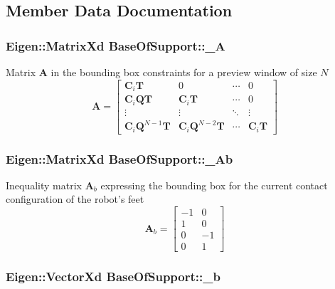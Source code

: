 \subsection{\-Member \-Data \-Documentation}
\hypertarget{classBaseOfSupport_a54a35d087a8dfaee9a27d025d46f706d}{
\subsubsection[{\-\_\-\-A}]{\setlength{\rightskip}{0pt plus 5cm}\-Eigen\-::\-Matrix\-Xd {\bf \-Base\-Of\-Support\-::\-\_\-\-A}}}\label{classBaseOfSupport_a54a35d087a8dfaee9a27d025d46f706d}
\-Matrix $\mathbf{A}$ in the bounding box constraints for a preview window of size $N$ \[ \mathbf{A} = \left[\begin{array}{cccc} \mathbf{C}_i\mathbf{T} & 0 & \cdots & 0 \\ \mathbf{C}_i\mathbf{Q}\mathbf{T} & \mathbf{C}_i\mathbf{T} & \cdots & 0 \\ \vdots & \vdots & \ddots & \vdots \\ \mathbf{C}_i\mathbf{Q}^{N-1}\mathbf{T} & \mathbf{C}_i\mathbf{Q}^{N-2}\mathbf{T} & \cdots & \mathbf{C}_i\mathbf{T} \end{array}\right] \] \hypertarget{classBaseOfSupport_a42d531cd89c34cf8821c5cdeff321bc1}{
\subsubsection[{\-\_\-\-Ab}]{\setlength{\rightskip}{0pt plus 5cm}\-Eigen\-::\-Matrix\-Xd {\bf \-Base\-Of\-Support\-::\-\_\-\-Ab}}}\label{classBaseOfSupport_a42d531cd89c34cf8821c5cdeff321bc1}
\-Inequality matrix $\mathbf{A}_b$ expressing the bounding box for the current contact configuration of the robot's feet \[ \mathbf{A}_b = \left[\begin{array}{cc} -1 & 0\\ 1 & 0\\ 0 & -1\\ 0 & 1 \end{array}\right] \] \hypertarget{classBaseOfSupport_a9a77c3e98a73065f60b99e888c50fcc7}{
\subsubsection[{\-\_\-b}]{\setlength{\rightskip}{0pt plus 5cm}\-Eigen\-::\-Vector\-Xd {\bf \-Base\-Of\-Support\-::\-\_\-b}}}\label{classBaseOfSupport_a9a77c3e98a73065f60b99e888c50fcc7}
